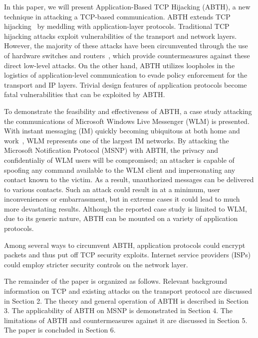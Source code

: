 \documentclass{sig-alternate}
\begin{document}
\begin{sloppypar}
In this paper, we will present Application-Based TCP Hijacking (ABTH), a new technique in attacking a TCP-based communication.
ABTH extends TCP hijacking~\cite{stamp:infosec} by meddling with application-layer protocols.
Traditional TCP hijacking attacks exploit vulnerabilities of the transport and network layers.
However, the majority of these attacks have been circumvented through the use of hardware switches and routers~\cite{dubrawsky:layer2}, which provide countermeasures against these direct low-level attacks.
On the other hand, ABTH utilizes loopholes in the logistics of application-level communication to evade policy enforcement for the transport and IP layers.
Trivial design features of application protocols become fatal vulnerabilities that can be exploited by ABTH.
\end{sloppypar}

To demonstrate the feasibility and effectiveness of ABTH, a case study attacking the communications of Microsoft Windows Live Messenger (WLM) is presented.
With instant messaging (IM) quickly becoming ubiquitous at both home and work~\cite{aol:survey}, WLM represents one of the largest IM networks.
By attacking the Microsoft Notification Protocol (MSNP) with ABTH, the privacy and confidentialiy of WLM users will be compromised; an attacker is capable of spoofing any command available to the WLM client and impersonating any contact known to the victim.
As a result, unauthorized messages can be delivered to various contacts.
Such an attack could result in at a minimum, user inconveniences or embarrassment, but in extreme cases it could lead to much more devastating results.
Although the reported case study is limited to WLM, due to its generic nature, ABTH can be mounted on a variety of application protocols.

Among several ways to circumvent ABTH, application protocols could encrypt packets and thus put off TCP security exploits.
Internet service providers (ISPs) could employ stricter security controls on the network layer.

The remainder of the paper is organized as follows.
Relevant background information on TCP and existing attacks on the transport protocol are discussed in Section 2.
The theory and general operation of ABTH is described in Section 3.
The applicability of ABTH on MSNP is demonstrated in Section 4.
The limitations of ABTH and countermeasures against it are discussed in Section 5.
The paper is concluded in Section 6.
\end{document}
